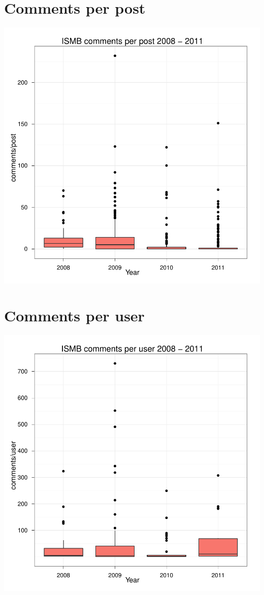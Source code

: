 \documentclass[a4paper,10pt]{article}
\begin{document}
\section{Comments per post}

\begin{center}
\includegraphics{ismb-010}
\end{center}

\section{Comments per user}

\begin{center}
\includegraphics{ismb-012}
\end{center}
\end{document}

